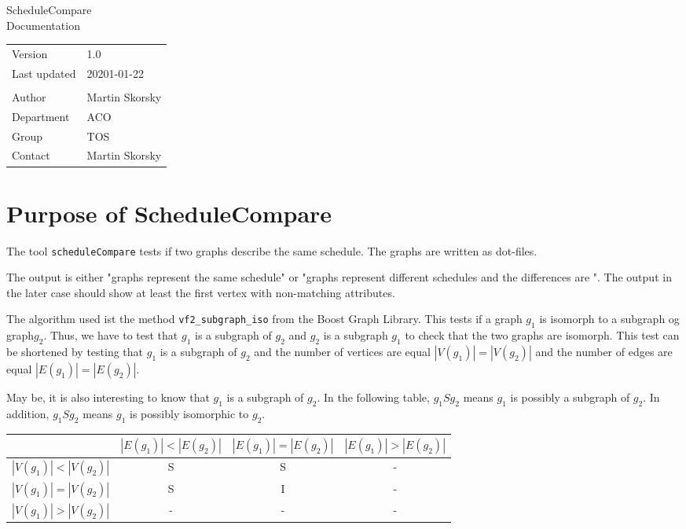 \documentclass[12pt,a4paper]{report}
\begin{document}
\begin{titlepage}
\begin{center}
\vspace{2em}
\Huge{ScheduleCompare}\\[2cm]
\Large{Documentation}\\[2cm]
\begin{large}
\begin{tabularx}{\textwidth}{Xl}
Version & 1.0\\
Last updated & 20201-01-22\\
\vspace{1.5cm}\\
Author & Martin Skorsky\\
Department & ACO \\
Group & TOS\\
Contact & Martin Skorsky
\end{tabularx}%
\end{large}

\vfill

\end{center}
\end{titlepage}
\tableofcontents
\chapter{Purpose of ScheduleCompare}
The tool \texttt{scheduleCompare} tests if two graphs describe the same schedule. The graphs are written as dot-files.

The output is either "graphs represent the same schedule" or "graphs represent different schedules and the differences are \textellipsis".
The output in the later case should show at least the first vertex with non-matching attributes.

The algorithm used ist the method \texttt{vf2\_subgraph\_iso} from the Boost Graph Library. This tests if a graph $g_1$ is isomorph to a subgraph og graph$g_2$. Thus, we have to test that $g_1$ is a subgraph of $g_2$ and $g_2$ is a subgraph $g_1$ to check that the two graphs are isomorph. This test can be shortened by testing that $g_1$ is a subgraph of $g_2$ and the number of vertices are equal $|V(g_1)| = |V(g_2)|$ and the number of edges are equal $|E(g_1)| = |E(g_2)|$.

May be, it is also interesting to know that $g_1$ is a subgraph of $g_2$. In the following table, $g_1 S g_2$ 
means $g_1$ is possibly a subgraph of $g_2$. In addition, $g_1 S g_2$ means $g_1$ is possibly isomorphic to $g_2$. 
\begin{table}
\label{tab:cardinalities}
\begin{tabular}[t]{|c|ccc|}
\hline
                     & $|E(g_1)|<|E(g_2)|$ & $|E(g_1)|=|E(g_2)|$ & $|E(g_1)|>|E(g_2)|$ \\ \hline
 $|V(g_1)|<|V(g_2)|$ &          S          &          S          &          -  \\
 $|V(g_1)|=|V(g_2)|$ &          S          &          I          &          -  \\
 $|V(g_1)|>|V(g_2)|$ &          -          &          -          &          -  \\ \hline
\end{tabular}
\end{table}
\end{document}
